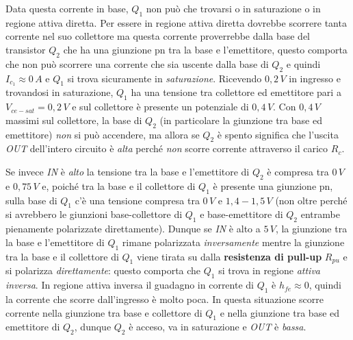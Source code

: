 \documentclass[12pt, a4paper]{report}
\begin{document}
Data questa corrente in base, $Q_1$ non può che trovarsi o in saturazione o in regione attiva diretta. Per essere in regione attiva diretta dovrebbe scorrere tanta corrente nel suo collettore ma questa corrente proverrebbe dalla base del transistor $Q_2$ che ha una giunzione pn tra la base e l'emettitore, questo comporta che non può scorrere una corrente che sia uscente dalla base di $Q_2$ e quindi $I_{c_1} \approx 0\,A$ e $Q_1$ si trova sicuramente in \textit{saturazione}. Ricevendo $0,2\,V$ in ingresso e trovandosi in saturazione, $Q_1$ ha una tensione tra collettore ed emettitore pari a $V_{ce-sat} = 0,2\,V$ e sul collettore è presente un potenziale di $0,4\,V$. Con $0,4\,V$ massimi sul collettore, la base di $Q_2$ (in particolare la giunzione tra base ed emettitore) \textit{non} si può accendere, ma allora se $Q_2$ è spento significa che l'uscita \textit{OUT} dell'intero circuito è \textit{alta} perché \textit{non} scorre corrente attraverso il carico $R_c$.

Se invece \textit{IN} è \textit{alto} la tensione tra la base e l'emettitore di $Q_2$ è compresa tra $0\,V$ e $0,75\,V$ e, poiché tra la base e il collettore di $Q_1$ è presente una giunzione pn, sulla base di $Q_1$ c'è una tensione compresa tra $0\,V$ e $1,4 - 1,5\,V$ (non oltre perché si avrebbero le giunzioni base-collettore di $Q_1$ e base-emettitore di $Q_2$ entrambe pienamente polarizzate direttamente). Dunque se \textit{IN} è alto a $5\,V$, la giunzione tra la base e l'emettitore di $Q_1$ rimane polarizzata \textit{inversamente} mentre la giunzione tra la base e il collettore di $Q_1$ viene tirata su dalla \textbf{resistenza di pull-up} $R_{pu}$ e si polarizza \textit{direttamente}: questo comporta che $Q_1$ si trova in regione \textit{attiva inversa}. In regione attiva inversa il guadagno in corrente di $Q_1$ è $h_{fe} \approx 0$, quindi la corrente che scorre dall'ingresso è molto poca. In questa situazione scorre corrente nella giunzione tra base e collettore di $Q_1$ e nella giunzione tra base ed emettitore di $Q_2$, dunque $Q_2$ è acceso, va in saturazione e \textit{OUT} è \textit{bassa}.
\end{document}
